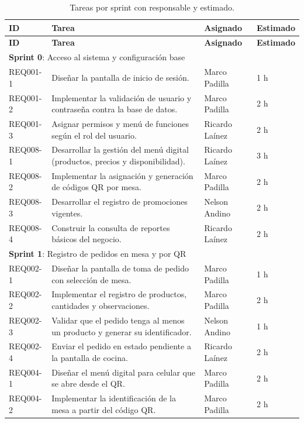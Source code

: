 \documentclass[a4paper, 11pt]{article}
\begin{document}
{\small
\begin{longtable}{|p{1.9cm}|p{7.6cm}|p{2.6cm}|p{1.3cm}|}
\caption{Tareas por sprint con responsable y estimado.}\label{tab:tareas}\\
\hline
\textbf{ID} & \textbf{Tarea} & \textbf{Asignado} & \textbf{Estimado} \\ \hline
\endfirsthead
\hline
\textbf{ID} & \textbf{Tarea} & \textbf{Asignado} & \textbf{Estimado} \\ \hline
\endhead
\multicolumn{4}{|l|}{\textbf{Sprint 0}: Acceso al sistema y configuración base} \\ \hline
REQ001-1 & Diseñar la pantalla de inicio de sesión. & Marco Padilla & 1 h \\ \hline
REQ001-2 & Implementar la validación de usuario y contraseña contra la base de datos. & Marco Padilla & 2 h \\ \hline
REQ001-3 & Asignar permisos y menú de funciones según el rol del usuario. & Ricardo Laínez & 2 h \\ \hline
REQ008-1 & Desarrollar la gestión del menú digital (productos, precios y disponibilidad). & Ricardo Laínez & 3 h \\ \hline
REQ008-2 & Implementar la asignación y generación de códigos QR por mesa. & Marco Padilla & 2 h \\ \hline
REQ008-3 & Desarrollar el registro de promociones vigentes. & Nelson Andino & 2 h \\ \hline
REQ008-4 & Construir la consulta de reportes básicos del negocio. & Ricardo Laínez & 2 h \\ \hline
\multicolumn{4}{|l|}{\textbf{Sprint 1}: Registro de pedidos en mesa y por QR} \\ \hline
REQ002-1 & Diseñar la pantalla de toma de pedido con selección de mesa. & Marco Padilla & 1 h \\ \hline
REQ002-2 & Implementar el registro de productos, cantidades y observaciones. & Marco Padilla & 2 h \\ \hline
REQ002-3 & Validar que el pedido tenga al menos un producto y generar su identificador. & Nelson Andino & 1 h \\ \hline
REQ002-4 & Enviar el pedido en estado pendiente a la pantalla de cocina. & Ricardo Laínez & 2 h \\ \hline
REQ004-1 & Diseñar el menú digital para celular que se abre desde el QR. & Marco Padilla & 2 h \\ \hline
REQ004-2 & Implementar la identificación de la mesa a partir del código QR. & Marco Padilla & 2 h \\ \hline

\end{longtable}}
\end{document}
